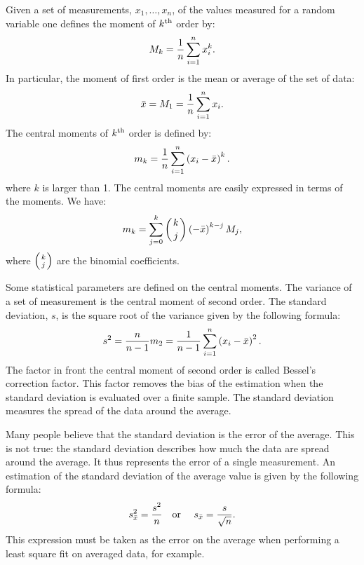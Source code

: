 \documentclass[twoside]{book}
\begin{document}
Given a set of measurements, $x_1,\ldots,x_n$, of the values
measured for a random variable one defines the moment of $k^{\mathop{\rm th}}$
order by:
\begin{equation}
  M_k={1\over n}\sum_{i=1}^n x_i^k.
\end{equation}
In particular, the moment of first order is the mean or average of
the set of data:
\begin{equation}
\label{eq:average}
  \bar{x}=M_1={1\over n}\sum_{i=1}^n x_i.
\end{equation}
The central moments of $k^{\mathop{\rm th}}$ order is defined by:
\begin{equation}
  m_k={1\over n}\sum_{i=1}^n \left(x_i-\bar{x}\right)^k.
\end{equation}
where $k$ is larger than 1. The central moments are easily
expressed in terms of the moments. We have:
\begin{equation}
  m_k=\sum_{j=0}^k \left({k \atop j}\right)\left(-\bar{x}\right)^{k-j}M_j,
\end{equation}
where $\left({k \atop j}\right)$ are the binomial coefficients.

Some statistical parameters are defined on the central moments.
The variance of a set of measurement is the central moment of
second order. The standard deviation, $s$, is the square root of
the variance given by the following formula:
\begin{equation}
s^2={\displaystyle n \over \displaystyle n-1}m_2 ={\displaystyle 1
\over \displaystyle n-1} \sum_{i=1}^n \left(x_i-\bar{x}\right)^2.
\end{equation}
The factor in front the central moment of second order is called
Bessel's correction factor. This factor removes the bias of the
estimation when the standard deviation is evaluated over a finite
sample. The standard deviation measures the spread of the data
around the average.

Many people believe that the standard deviation is the error of
the average. This is not true: the standard deviation describes
how much the data are spread around the average. It thus
represents the error of a single measurement. An estimation of the
standard deviation of the average value is given by the following
formula:
\begin{equation}
\label{eq:averagerror}
  s_{\bar{x}}^2={\displaystyle s^2 \over n}
  \mbox{\quad or \quad}
  s_{\bar{x}}={\displaystyle s \over \sqrt{n}}.
\end{equation}
This expression must be taken as the error on the average when
performing a least square fit on averaged data, for example.
\end{document}
